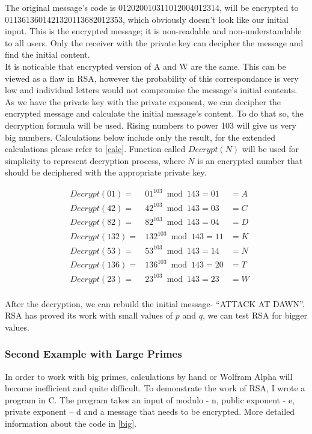 \documentclass[a4paper, 12pt]{article}
\begin{document}
The original message's code is 012020010311012004012314, will be encrypted to
0113613601421320113682012353, which obviously doesn’t look like our initial input. This is
the encrypted message; it is non-readable and non-understandable to all users. Only the receiver
with the private key can decipher the message and find the initial content.\\

It is noticable that encrypted version of A and W are the same. This can be viewed as a flaw in RSA, however
the probability of this correspondance is very low and individual letters would not compromise the message's
initial contents.\\

As we have the private key with the private exponent, we can decipher the encrypted message and
calculate the initial message’s content. To do that so, the decryption formula will be used. Rising
numbers to power 103 will give us very big numbers. Calculations below include only the result,
for the extended calculations please refer to \ref{calc}. Function called $Decrypt(N)$ will be used
for simplicity to represent decryption process, where $N$ is an encrypted number that should be
deciphered with the appropriate private key.

\begin{align*}
  &Decrypt(01)=&01^{103} \bmod 143=01&=A\\
  &Decrypt(42)=&42^{103} \bmod 143=03&=C\\
  &Decrypt(82)=&82^{103} \bmod 143=04&=D\\
  &Decrypt(132)=&132^{103} \bmod 143=11&=K\\
  &Decrypt(53)=&53^{103} \bmod 143=14&=N\\
  &Decrypt(136)=&136^{103} \bmod 143=20&=T\\
  &Decrypt(23)=&23^{103} \bmod 143=23&=W\\
\end{align*}

After the decryption, we can rebuild the initial message- “ATTACK AT DAWN”.
RSA has proved its work with small values of $p$ and $q$, we can test RSA for bigger values.

\subsubsection{Second Example with Large Primes}
\label{bbsec:second}

In order to work with big primes, calculations by hand or Wolfram Alpha will become inefficient
and quite difficult. To demonstrate the work of RSA, I wrote a program in C. 
The program takes an input of modulo - n, public exponent - e, private exponent – d
and a message that needs to be encrypted. More detailed information about the code in
\ref{big}.\\
\end{document}

